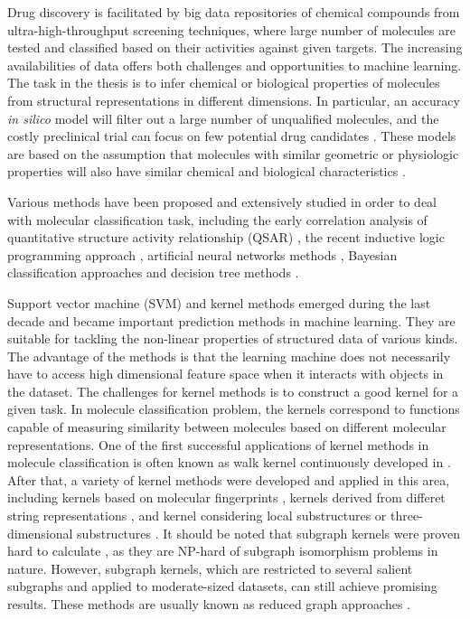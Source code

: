 \documentclass[english]{tktltiki}
\begin{document}
Drug discovery is facilitated by big data repositories of chemical compounds from ultra-high-throughput screening techniques, where large number of molecules are tested and classified based on their activities against given targets. The increasing availabilities of data offers both challenges and opportunities to machine learning. The task in the thesis is to infer chemical or biological properties of molecules from structural representations in different dimensions. In particular, an accuracy {\em in silico} model will filter out a large number of unqualified molecules, and the costly preclinical trial can focus on few potential drug candidates \cite{trotter01}. These models are based on the assumption that molecules with similar geometric or physiologic properties will also have similar chemical and biological characteristics \cite{hansch64}.


Various methods have been proposed and extensively studied in order to deal with molecular classification task, including the early correlation analysis of quantitative structure activity relationship (QSAR) \cite{hansch64}, the recent inductive logic programming approach \cite{king96}, artificial neural networks methods \cite{bernazzani06, keseru00}, Bayesian classification approaches \cite{gao99, watson08} and decision tree methods \cite{stockfisch03}. 


Support vector machine (SVM) and kernel methods \cite{cristianini00} emerged during the last decade and became important prediction methods in machine learning. They are suitable for tackling the non-linear properties of structured data of various kinds. The advantage of the methods is that the learning machine does not necessarily have to access high dimensional feature space when it interacts with objects in the dataset. The challenges for kernel methods is to construct a good kernel for a given task. In molecule classification problem, the kernels correspond to functions capable of measuring similarity between molecules based on different molecular representations. One of the first successful applications of kernel methods in molecule classification is often known as walk kernel continuously developed in \cite{gartner03, kashima03, mahe04}. After that, a variety of kernel methods were developed and applied in this area, including kernels based on molecular fingerprints \cite{ralaivola05}, kernels derived from differet string representations \cite{swamidass05}, and kernel considering local substructures \cite{menchetti05, ceroni07} or three-dimensional substructures \cite{ceroni07}. It should be noted that subgraph kernels were proven hard to calculate \cite{gartner05}, as they are NP-hard of subgraph isomorphism problems in nature. However, subgraph kernels, which are restricted to several salient subgraphs and applied to moderate-sized datasets, can still achieve promising results. These methods are usually known as reduced graph approaches \cite{harper}.
\end{document}
